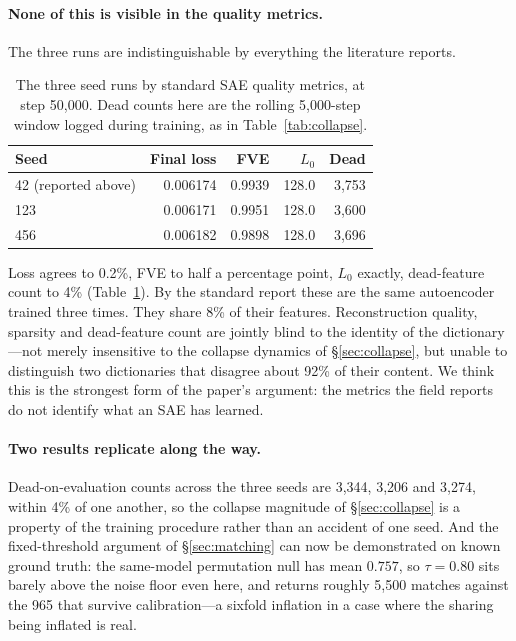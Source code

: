 \documentclass[11pt]{article}
\begin{document}
\paragraph{None of this is visible in the quality metrics.} The three runs are
indistinguishable by everything the literature reports.

\begin{table}[t]
  \centering
  \caption{The three seed runs by standard SAE quality metrics, at step 50{,}000.
    Dead counts here are the rolling 5{,}000-step window logged during training, as in
    Table~\ref{tab:collapse}.}
  \label{tab:seedmetrics}
  \smallskip
  \begin{tabular}{lrrrr}
    \toprule
    Seed & Final loss & FVE & $L_0$ & Dead \\
    \midrule
    42 (reported above) & 0.006174 & 0.9939 & 128.0 & 3{,}753 \\
    123                 & 0.006171 & 0.9951 & 128.0 & 3{,}600 \\
    456                 & 0.006182 & 0.9898 & 128.0 & 3{,}696 \\
    \bottomrule
  \end{tabular}
\end{table}

Loss agrees to 0.2\%, FVE to half a percentage point, $L_0$ exactly, dead-feature count
to 4\% (Table~\ref{tab:seedmetrics}). By the standard report these are the same
autoencoder trained three times. They share 8\% of their features. Reconstruction
quality, sparsity and dead-feature count are jointly blind to the identity of the
dictionary---not merely insensitive to the collapse dynamics of \S\ref{sec:collapse},
but unable to distinguish two dictionaries that disagree about 92\% of their content.
We think this is the strongest form of the paper's argument: the metrics the field
reports do not identify what an SAE has learned.

\paragraph{Two results replicate along the way.} Dead-on-evaluation counts across the
three seeds are 3{,}344, 3{,}206 and 3{,}274, within 4\% of one another, so the collapse
magnitude of \S\ref{sec:collapse} is a property of the training procedure rather than an
accident of one seed. And the fixed-threshold argument of \S\ref{sec:matching} can now be
demonstrated on known ground truth: the same-model permutation null has mean $0.757$, so
$\tau = 0.80$ sits barely above the noise floor even here, and returns roughly 5{,}500
matches against the 965 that survive calibration---a sixfold inflation in a case where
the sharing being inflated is real.
\end{document}

